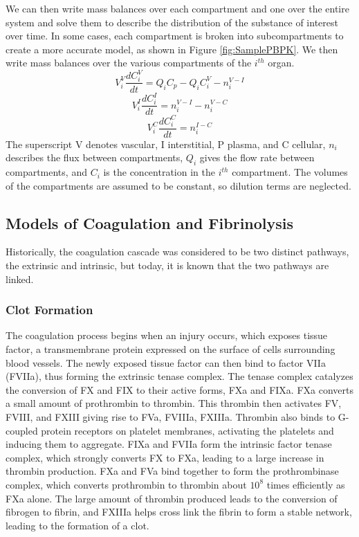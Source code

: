 \documentclass[12pt]{article}
\begin{document}
We can then write mass balances over each compartment and one over the entire system and solve them to describe the distribution of the substance of interest over time. 
In some cases, each compartment is broken into subcompartments to create a more accurate model, as shown in Figure \ref{fig:SamplePBPK}.
We then write mass balances over the various compartments of the $i^{th}$ organ. 
\begin{equation}
V^V_i\frac{dC^V_i}{dt} = Q_iC_p-Q_iC_i^V-n_i^{V-I}
\end{equation}
\begin{equation}
V^I_i\frac{dC^I_i}{dt} =n_i^{V-I}-n_i^{V-C}
\end{equation}
\begin{equation}
V^C_i\frac{dC^C_i}{dt} =n_i^{I-C}
\end{equation}
The superscript V denotes vascular, I interstitial, P plasma, and C cellular, $n_i$ describes the flux between compartments, $Q_i$ gives the flow rate between compartments, and $C_i$ is the concentration in the $i^{th}$ compartment. \citep{clewell2007physiologically} The volumes of the compartments are assumed to be constant, so dilution terms are neglected.
\subsection*{Models of Coagulation and Fibrinolysis}
Historically, the coagulation cascade was considered to be two distinct pathways, the extrinsic and intrinsic, but today, it is known that the two pathways are linked.\cite{adams2009review} 
\subsubsection*{Clot Formation}
The coagulation process begins when an injury occurs, which exposes tissue factor, a transmembrane protein expressed on the surface of cells surrounding blood vessels. \citep{mackman2009role} The newly exposed tissue factor can then bind to factor VIIa (FVIIa), thus forming the extrinsic tenase complex. The tenase complex catalyzes the conversion of FX and FIX to their active forms, FXa and FIXa. \cite{mann2006models} FXa converts a small amount of prothrombin to thrombin. \cite{orfeo2004factor} This thrombin then activates FV, FVIII, and FXIII giving rise to FVa, FVIIIa, FXIIIa. Thrombin also binds to G-coupled protein receptors on platelet membranes, activating the platelets and inducing them to aggregate.\citep{hoffman2009hematology} FIXa and FVIIa form the intrinsic factor tenase complex, which strongly converts FX to FXa, leading to a large increase in thrombin production. FXa and FVa bind together to form the prothrombinase complex, which converts prothrombin to thrombin about $10^8$ times efficiently as FXa alone. \cite{walker1994activation} The large amount of thrombin produced leads to the conversion of fibrogen to fibrin, and FXIIIa helps cross link the fibrin to form a stable network, leading to the formation of a clot. \cite{hoffman2009hematology}
\end{document}
